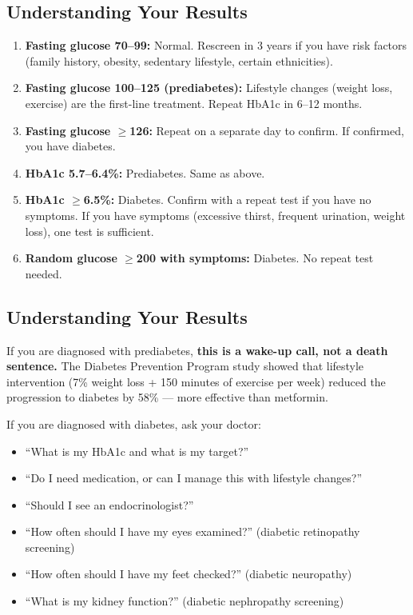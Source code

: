 \subsection{Understanding Your Results}

\begin{enumerate}
    \item \textbf{Fasting glucose 70--99:} Normal. Rescreen in 3 years if you have risk factors (family history, obesity, sedentary lifestyle, certain ethnicities).
    \item \textbf{Fasting glucose 100--125 (prediabetes):} Lifestyle changes (weight loss, exercise) are the first-line treatment. Repeat HbA1c in 6--12 months.
    \item \textbf{Fasting glucose $\geq$126:} Repeat on a separate day to confirm. If confirmed, you have diabetes.
    \item \textbf{HbA1c 5.7--6.4\%:} Prediabetes. Same as above.
    \item \textbf{HbA1c $\geq$6.5\%:} Diabetes. Confirm with a repeat test if you have no symptoms. If you have symptoms (excessive thirst, frequent urination, weight loss), one test is sufficient.
    \item \textbf{Random glucose $\geq$200 with symptoms:} Diabetes. No repeat test needed.
\end{enumerate}

\subsection{Understanding Your Results}

If you are diagnosed with prediabetes, \textbf{this is a wake-up call, not a death sentence.} The Diabetes Prevention Program study showed that lifestyle intervention (7\% weight loss + 150 minutes of exercise per week) reduced the progression to diabetes by 58\% --- more effective than metformin.

If you are diagnosed with diabetes, ask your doctor:
\begin{itemize}
    \item ``What is my HbA1c and what is my target?''
    \item ``Do I need medication, or can I manage this with lifestyle changes?''
    \item ``Should I see an endocrinologist?''
    \item ``How often should I have my eyes examined?'' (diabetic retinopathy screening)
    \item ``How often should I have my feet checked?'' (diabetic neuropathy)
    \item ``What is my kidney function?'' (diabetic nephropathy screening)
\end{itemize}

